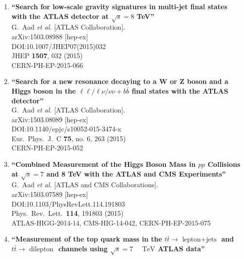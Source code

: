\documentclass{article}
\begin{document}
\begin{enumerate}
\item%
{\bf ``Search for low-scale gravity signatures in multi-jet final states with the ATLAS detector at $\sqrt{s} = 8$ TeV''}
  \\{}G.~Aad {\it et al.} [ATLAS Collaboration].
  \\{}arXiv:1503.08988 [hep-ex]
  \\{}DOI:10.1007/JHEP07(2015)032
  \\{}JHEP {\bf 1507}, 032 (2015)
  \\{}CERN-PH-EP-2015-066
\item%
{\bf ``Search for a new resonance decaying to a W or Z boson and a Higgs boson in the $\ell \ell / \ell \nu / \nu \nu + b \bar{b}$ final states with the ATLAS detector''}
  \\{}G.~Aad {\it et al.} [ATLAS Collaboration].
  \\{}arXiv:1503.08089 [hep-ex]
  \\{}DOI:10.1140/epjc/s10052-015-3474-x
  \\{}Eur.\ Phys.\ J.\ C {\bf 75}, no. 6, 263 (2015)
  \\{}CERN-PH-EP-2015-052
\item%
{\bf ``Combined Measurement of the Higgs Boson Mass in $pp$ Collisions at $\sqrt{s}=7$ and 8 TeV with the ATLAS and CMS Experiments''}
  \\{}G.~Aad {\it et al.} [ATLAS and CMS Collaborations].
  \\{}arXiv:1503.07589 [hep-ex]
  \\{}DOI:10.1103/PhysRevLett.114.191803
  \\{}Phys.\ Rev.\ Lett.\  {\bf 114}, 191803 (2015)
  \\{}ATLAS-HIGG-2014-14, CMS-HIG-14-042, CERN-PH-EP-2015-075
\item%
{\bf ``Measurement of the top quark mass in the $t\bar{t}\rightarrow \text{ lepton+jets } $ and $t\bar{t}\rightarrow \text{ dilepton } $ channels using $\sqrt{s}=7$   ${\mathrm { TeV}}$ ATLAS data''}

\end{enumerate}
\end{document}
